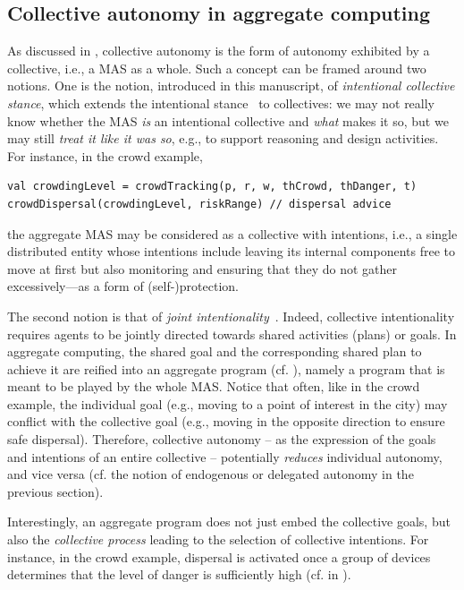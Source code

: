 \subsection{Collective autonomy in aggregate computing}
\label{contrib-collective-autonomy}

As discussed in , collective autonomy is the form of autonomy exhibited by a collective,
 i.e., a MAS as a whole.
%
Such a concept can be framed around two notions.
%
One is the notion, introduced in this manuscript, of \emph{intentional collective stance},
 which extends the intentional stance~\cite{dennett1989intentional} to collectives:
 we may not really know whether the MAS \emph{is} an intentional collective
 and \emph{what} makes it so,
  but we may still \emph{treat it like it was so}, e.g., to support reasoning and design activities.
%
For instance, in the crowd example,
%
\begin{lstlisting}
val crowdingLevel = crowdTracking(p, r, w, thCrowd, thDanger, t)
crowdDispersal(crowdingLevel, riskRange) // dispersal advice
\end{lstlisting}
%
the aggregate MAS may be considered as a collective
 with intentions, i.e., 
 a single distributed entity
 whose intentions include leaving its internal components free
 to move at first
 but also 
 monitoring and ensuring that they do not gather excessively---as a form of (self-)protection.

The second notion is that of \emph{joint intentionality}~\cite{DBLP:journals/mima/Huebner15}.
%
Indeed, collective intentionality 
 requires agents to be jointly directed towards 
 shared activities (plans) or goals.
%
In aggregate computing, the shared goal 
 and the corresponding shared plan to achieve it
 are reified into an aggregate program (cf. ),
 namely a program that is  
 meant to be played by the whole MAS.
%
Notice that often, like in the crowd example,
 the individual goal (e.g., moving to a point of interest in the city)
 may conflict with the collective goal
 (e.g., moving in the opposite direction to ensure safe dispersal).
%
Therefore, collective autonomy -- as the expression of the goals and intentions of an entire collective -- potentially \emph{reduces} individual autonomy, and vice versa (cf. the notion of endogenous or delegated autonomy in the previous section).

Interestingly, an aggregate program does not just embed
 the collective goals,
 but also the \emph{collective process}
 leading to the selection of collective intentions.
%
For instance, in the crowd example,
 dispersal is activated 
 once a group of devices
 determines that the level of danger is sufficiently high
 (cf.  in ).
 
